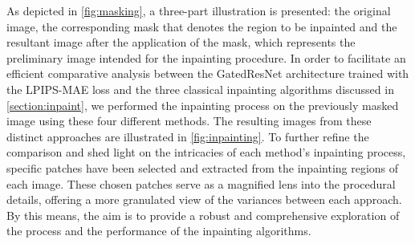 As depicted in \autoref{fig:masking}, a three-part illustration is presented: the original image, the corresponding mask that denotes the region to be inpainted and the resultant image after the application of the mask, which represents the preliminary image intended for the inpainting procedure. In order to facilitate an efficient comparative analysis between the GatedResNet architecture trained with the LPIPS-MAE loss and the three classical inpainting algorithms discussed in \autoref{section:inpaint}, we performed the inpainting process on the previously masked image using these four different methods. The resulting images from these distinct approaches are illustrated in \autoref{fig:inpainting}. To further refine the comparison and shed light on the intricacies of each method's inpainting process, specific patches have been selected and extracted from the inpainting regions of each image. These chosen patches serve as a magnified lens into the procedural details, offering a more granulated view of the variances between each approach. By this means, the aim is to provide a robust and comprehensive exploration of the process and the performance of the inpainting algorithms.

